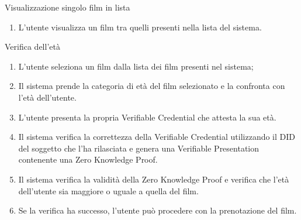 \begin{usecase}{5.1}{Visualizzazione singolo film in lista}\label{uc:visualizzazione-singolo-lista-film}
  \usecasemain{}
  
  \begin{enumerate}
    \item L'utente visualizza un film tra quelli presenti nella lista del sistema.
  \end{enumerate}
\end{usecase}

\begin{usecase}{6}{Verifica dell'età}\label{uc:verifica-eta}
  \usecasemain{}
  
  \begin{enumerate}
    \item L'utente seleziona un film dalla lista dei film presenti nel sistema;
    \item Il sistema prende la categoria di età del film selezionato e la confronta con l'età dell'utente.
    \item L'utente presenta la propria Verifiable Credential che attesta la sua età.
    \item Il sistema verifica la correttezza della Verifiable Credential utilizzando il DID del soggetto che l'ha rilasciata e genera una Verifiable Presentation contenente una Zero Knowledge Proof.
    \item Il sistema verifica la validità della Zero Knowledge Proof e verifica che l'età dell'utente sia maggiore o uguale a quella del film.
    \item Se la verifica ha successo, l'utente può procedere con la prenotazione del film.
  \end{enumerate}
\end{usecase}

